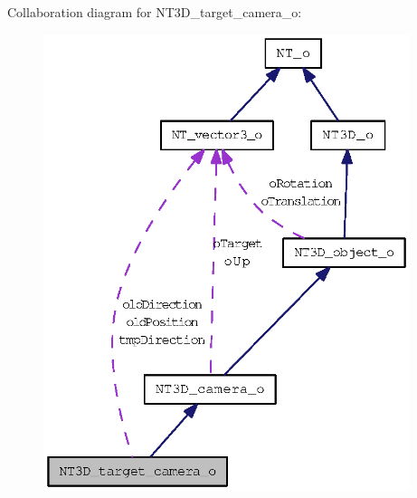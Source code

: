 Collaboration diagram for NT3D\_\-target\_\-camera\_\-o:
\nopagebreak
\begin{figure}[H]
\begin{center}
\leavevmode
\includegraphics[width=304pt]{class_n_t3_d__target__camera__o__coll__graph}
\end{center}
\end{figure}
